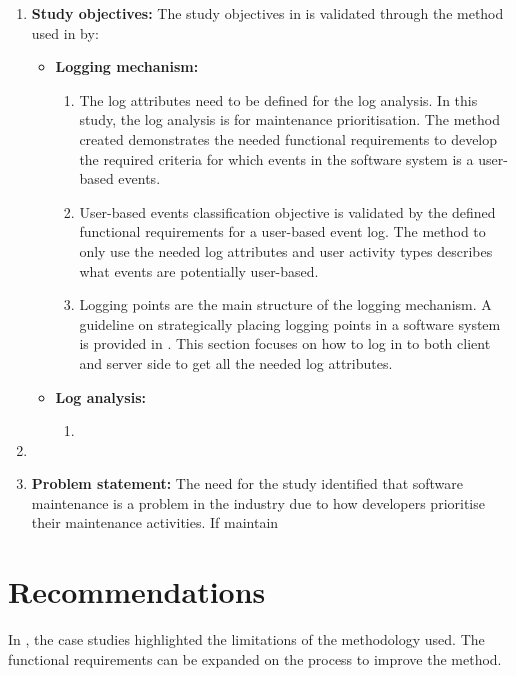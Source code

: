 \begin{enumerate}[label=\textbf{\Roman*.}]
	\item \textbf{Study objectives:} The study objectives in  is validated through the method used in  by:
		\begin{itemize}
			\item \textbf{Logging mechanism:}
			  \begin{enumerate}
				\item The log attributes need to be defined for the log analysis. In this study, the log analysis is for maintenance prioritisation. The method created demonstrates the needed functional requirements to develop the required criteria for which events in the software system is a user-based events.
				\item User-based events classification objective is validated by the defined functional requirements for a user-based event log. The method to only use the needed log attributes and user activity types describes what events are potentially user-based.
				\item Logging points are the main structure of the logging mechanism. A guideline on strategically placing logging points in a software system is provided in . This section focuses on how to log in to both client and server side to get all the needed log attributes.
			  \end{enumerate}

			\item \textbf{Log analysis:}
			 \begin{enumerate}
				\item 
			 \end{enumerate}
		\end{itemize}

	\item
	\item \textbf{Problem statement:} The need for the study identified that software maintenance is a problem in the industry due to how developers prioritise their maintenance activities. If maintain
\end{enumerate}

\section{Recommendations}
In , the case studies highlighted the limitations of the methodology used. The functional requirements can be expanded on the process to improve the method.

